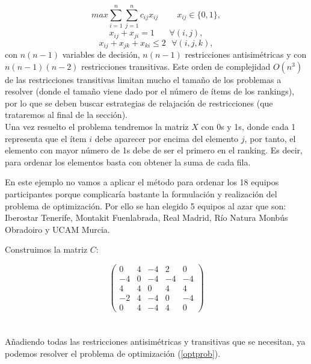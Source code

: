 \begin{equation} \label{optprob}
	max \sum_{i=1}^{n} \sum_{j=1}^{n} c_{ij} x_{ij} \ \ \ \ \ \ \ \ \ \ x_{ij} \in \{0,1\} ,
\end{equation}
\begin{equation*}
	x_{ij} + x_{ji} = 1 \ \ \ \ \ \ \ \ \forall (i,j),
\end{equation*}
\begin{equation*}
	x_{ij} + x_{jk} + x_{ki} \leq 2 \ \ \ \forall (i,j,k),
\end{equation*}
con $n(n-1)$ variables de decisión, $n(n-1)$ restricciones antisimétricas y con $n(n-1)(n-2)$ restricciones transitivas. Este orden de complejidad $O(n^{3})$ de las restricciones transitivas limitan mucho el tamaño de los problemas a resolver (donde el tamaño viene dado por el número de ítems de los rankings), por lo que se deben buscar estrategias de relajación de restricciones (que trataremos al final de la sección).\\

Una vez resuelto el problema tendremos la matriz $X$ con 0s y 1s, donde cada 1 representa que el ítem $i$ debe aparecer por encima del elemento $j$, por tanto, el elemento con mayor número de 1s debe de ser el primero en el ranking. Es decir, para ordenar los elementos basta con obtener la suma de cada fila.\\   
 
\begin{ejem} En este ejemplo no vamos a aplicar el método para ordenar los 18 equipos participantes porque complicaría bastante la formulación y realización del problema de optimización. Por ello se han elegido 5 equipos al azar que son: Iberostar Tenerife, Montakit Fuenlabrada, Real Madrid, Río Natura Monbús Obradoiro y UCAM Murcia.
\end{ejem}	
Construimos la matriz $C$:

\[	
	\left( \begin{array}{ccccc}
		0 & 4 & -4 & 2 & 0\\
		-4 & 0 & -4 & -4 & -4\\
		4 & 4 & 0 & 4 & 4\\
		-2 & 4 & -4 & 0 & -4\\
		0 & 4 & -4 & 4 & 0
	\end{array} \right) 
\]	
\ \\  \ \\
Añadiendo todas las restricciones antisimétricas y transitivas que se necesitan, ya podemos resolver el problema de optimización (\ref{optprob}).\\

